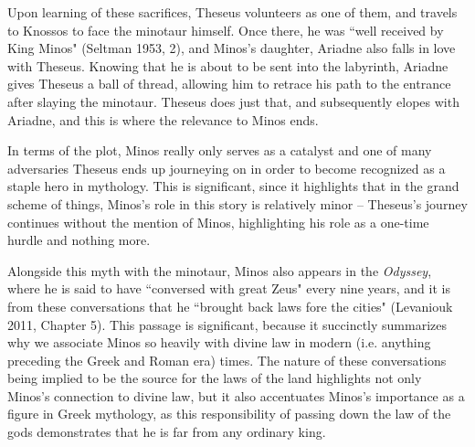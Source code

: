 \documentclass[12pt]{article}
\begin{document}
	Upon learning of these sacrifices, Theseus volunteers as one of them, and travels to Knossos to face the 
	minotaur himself. Once there, he was ``well received by King Minos" (Seltman 1953, 2), and Minos's daughter, 
	Ariadne also falls in love with Theseus. Knowing that he is about to be sent into the labyrinth, Ariadne gives 
	Theseus a ball of thread, allowing him to retrace his path to the entrance after slaying the minotaur. Theseus 
	does just that, and subsequently elopes with Ariadne, and this is where the relevance to Minos ends. 

	In terms of the plot, Minos really only serves as a catalyst and one of many adversaries Theseus ends up 
	journeying on in order to become recognized as a staple hero in mythology. This is significant, since it highlights 
	that in the grand scheme of things, Minos's role in this story is relatively minor -- Theseus's journey 
	continues without the mention of Minos, highlighting his role as a one-time hurdle and nothing more.   

	Alongside this myth with the minotaur, Minos also appears in the \textit{Odyssey}, where he is 
	said to have ``conversed with great Zeus" every nine years, and it is from these conversations that he ``brought 
	back laws fore the cities" (Levaniouk 2011, Chapter 5). This passage is significant, because it succinctly 
	summarizes why we associate Minos so heavily with divine law in modern (i.e. anything preceding the Greek 
	and Roman era) times. The nature of these conversations being implied to be the source for the laws 
	of the land highlights not only Minos's connection to divine law, but it also accentuates Minos's importance 
	as a figure in Greek mythology, as this responsibility of passing down the law of the gods demonstrates
	that he is far from any ordinary king. 

\end{document}
